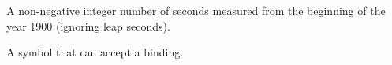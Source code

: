 \documentclass[10pt,twoside,english,pdftex]{article}
\begin{document}
\begin{glossary-list}

%
A non-negative integer number of seconds measured from the beginning of the
year 1900 (ignoring leap seconds).


%
A symbol that can accept a binding.

\end{glossary-list}


\renewcommand{\printindex}{%
  \htmlonly{\HlxSection{-5}{}*{\indexname}\label{hlxindex}}%
  \texorhtml{}{\htmlprintindex}}

\T\markright{}%
\T\pagestyle{plain}
\T\cleardoublepage
\W{}
\T\pagestyle{fancy}
\T\thispagestyle{fancybottom}
\T\fancyhead[er,ol]{}
\T\small
\T{}%
\printindex

\end{document}
